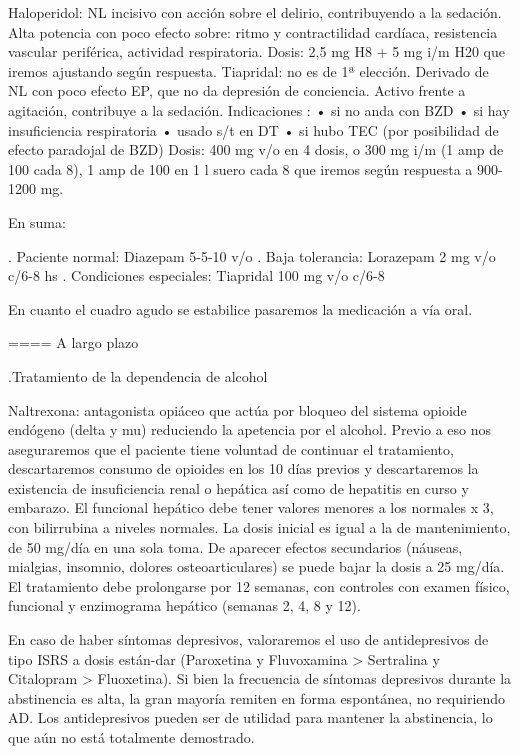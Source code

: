 \documentclass[encares.tex]{subfiles}
\begin{document}
Haloperidol: NL incisivo con acción sobre el delirio, contribuyendo a la sedación. Alta potencia con poco efecto sobre: ritmo y contractilidad cardíaca, resistencia vascular periférica, actividad respiratoria. Dosis: 2,5 mg H8 + 5 mg i/m H20 que iremos ajustando según respuesta.
Tiapridal: no es de 1ª elección. Derivado de NL con poco efecto EP, que no da depresión de conciencia. Activo frente a agitación, contribuye a la sedación. Indicaciones : • si no anda con BZD • si hay insuficiencia respiratoria • usado s/t en DT • si hubo TEC (por posibilidad de efecto paradojal de BZD) Dosis: 400 mg v/o en 4 dosis, o 300 mg i/m (1 amp de 100 cada 8), 1 amp de 100 en 1 l suero cada 8 que iremos según respuesta a 900-1200 mg.

En suma:

. Paciente normal: Diazepam 5-5-10 v/o
. Baja tolerancia: Lorazepam 2 mg v/o c/6-8 hs
. Condiciones especiales: Tiapridal 100 mg v/o c/6-8

En cuanto el cuadro agudo se estabilice pasaremos la medicación a vía oral.

==== A largo plazo

.Tratamiento de la dependencia de alcohol

Naltrexona: antagonista opiáceo que actúa por bloqueo del sistema opioide endógeno (delta y mu) reduciendo la apetencia por el alcohol. Previo a eso nos aseguraremos que el paciente tiene voluntad de continuar el tratamiento, descartaremos consumo de opioides en los 10 días previos y descartaremos la existencia de insuficiencia renal o hepática así como de hepatitis en curso y embarazo. El funcional hepático debe tener valores menores a los normales x 3, con bilirrubina a niveles normales. La dosis inicial es igual a la de mantenimiento, de 50 mg/día en una sola toma. De aparecer efectos secundarios (náuseas, mialgias, insomnio, dolores osteoarticulares) se puede bajar la dosis a 25 mg/día. El tratamiento debe prolongarse por 12 semanas, con controles con examen físico, funcional y enzimograma hepático (semanas 2, 4, 8 y 12).

En caso de haber síntomas depresivos, valoraremos el uso de antidepresivos de tipo ISRS a dosis están-dar (Paroxetina y Fluvoxamina > Sertralina y Citalopram > Fluoxetina). Si bien la frecuencia de síntomas depresivos durante la abstinencia es alta, la gran mayoría remiten en forma espontánea, no requiriendo AD. Los antidepresivos pueden ser de utilidad para mantener la abstinencia, lo que aún no está totalmente demostrado.
\end{document}

